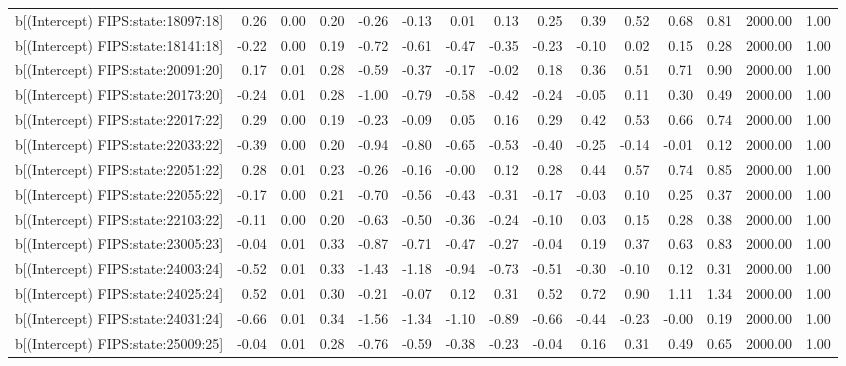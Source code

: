 \begin{table}[ht]
\begin{tabular}{rrrrrrrrrrrrrrr}
  b[(Intercept) FIPS:state:18097:18] & 0.26 & 0.00 & 0.20 & -0.26 & -0.13 & 0.01 & 0.13 & 0.25 & 0.39 & 0.52 & 0.68 & 0.81 & 2000.00 & 1.00 \\ 
  b[(Intercept) FIPS:state:18141:18] & -0.22 & 0.00 & 0.19 & -0.72 & -0.61 & -0.47 & -0.35 & -0.23 & -0.10 & 0.02 & 0.15 & 0.28 & 2000.00 & 1.00 \\ 
  b[(Intercept) FIPS:state:20091:20] & 0.17 & 0.01 & 0.28 & -0.59 & -0.37 & -0.17 & -0.02 & 0.18 & 0.36 & 0.51 & 0.71 & 0.90 & 2000.00 & 1.00 \\ 
  b[(Intercept) FIPS:state:20173:20] & -0.24 & 0.01 & 0.28 & -1.00 & -0.79 & -0.58 & -0.42 & -0.24 & -0.05 & 0.11 & 0.30 & 0.49 & 2000.00 & 1.00 \\ 
  b[(Intercept) FIPS:state:22017:22] & 0.29 & 0.00 & 0.19 & -0.23 & -0.09 & 0.05 & 0.16 & 0.29 & 0.42 & 0.53 & 0.66 & 0.74 & 2000.00 & 1.00 \\ 
  b[(Intercept) FIPS:state:22033:22] & -0.39 & 0.00 & 0.20 & -0.94 & -0.80 & -0.65 & -0.53 & -0.40 & -0.25 & -0.14 & -0.01 & 0.12 & 2000.00 & 1.00 \\ 
  b[(Intercept) FIPS:state:22051:22] & 0.28 & 0.01 & 0.23 & -0.26 & -0.16 & -0.00 & 0.12 & 0.28 & 0.44 & 0.57 & 0.74 & 0.85 & 2000.00 & 1.00 \\ 
  b[(Intercept) FIPS:state:22055:22] & -0.17 & 0.00 & 0.21 & -0.70 & -0.56 & -0.43 & -0.31 & -0.17 & -0.03 & 0.10 & 0.25 & 0.37 & 2000.00 & 1.00 \\ 
  b[(Intercept) FIPS:state:22103:22] & -0.11 & 0.00 & 0.20 & -0.63 & -0.50 & -0.36 & -0.24 & -0.10 & 0.03 & 0.15 & 0.28 & 0.38 & 2000.00 & 1.00 \\ 
  b[(Intercept) FIPS:state:23005:23] & -0.04 & 0.01 & 0.33 & -0.87 & -0.71 & -0.47 & -0.27 & -0.04 & 0.19 & 0.37 & 0.63 & 0.83 & 2000.00 & 1.00 \\ 
  b[(Intercept) FIPS:state:24003:24] & -0.52 & 0.01 & 0.33 & -1.43 & -1.18 & -0.94 & -0.73 & -0.51 & -0.30 & -0.10 & 0.12 & 0.31 & 2000.00 & 1.00 \\ 
  b[(Intercept) FIPS:state:24025:24] & 0.52 & 0.01 & 0.30 & -0.21 & -0.07 & 0.12 & 0.31 & 0.52 & 0.72 & 0.90 & 1.11 & 1.34 & 2000.00 & 1.00 \\ 
  b[(Intercept) FIPS:state:24031:24] & -0.66 & 0.01 & 0.34 & -1.56 & -1.34 & -1.10 & -0.89 & -0.66 & -0.44 & -0.23 & -0.00 & 0.19 & 2000.00 & 1.00 \\ 
  b[(Intercept) FIPS:state:25009:25] & -0.04 & 0.01 & 0.28 & -0.76 & -0.59 & -0.38 & -0.23 & -0.04 & 0.16 & 0.31 & 0.49 & 0.65 & 2000.00 & 1.00 \\ 

\end{tabular}
\end{table}
